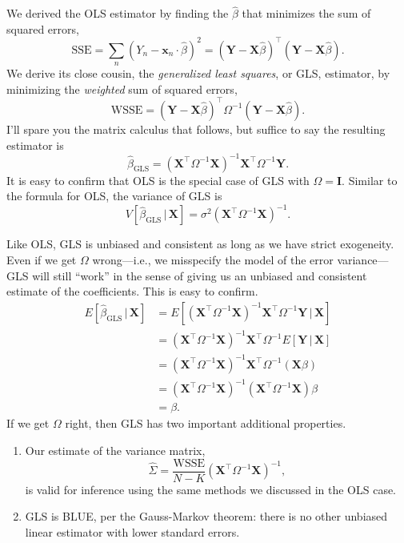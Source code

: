 \documentclass[12pt,oneside,openany]{book}
\begin{document}
We derived the OLS estimator by finding the \(\hat{\beta}\) that
minimizes the sum of squared errors, \[
\text{SSE}
= \sum_n (Y_n - \mathbf{x}_n \cdot \hat{\beta})^2
= (\mathbf{Y} - \mathbf{X} \hat{\beta})^\top (\mathbf{Y} - \mathbf{X} \hat{\beta}).
\] We derive its close cousin, the \emph{generalized least squares}, or
GLS, estimator, by minimizing the \emph{weighted} sum of squared errors,
\[
\text{WSSE} = (\mathbf{Y} - \mathbf{X} \hat{\beta})^\top \Omega^{-1} (\mathbf{Y} - \mathbf{X} \hat{\beta}).
\] I'll spare you the matrix calculus that follows, but suffice to say
the resulting estimator is \[
\hat{\beta}_{\text{GLS}} = (\mathbf{X}^\top \Omega^{-1} \mathbf{X})^{-1} \mathbf{X}^\top \Omega^{-1} \mathbf{Y}.
\] It is easy to confirm that OLS is the special case of GLS with
\(\Omega = \mathbf{I}\). Similar to the formula for OLS, the variance of
GLS is \[
V[\hat{\beta}_{\text{GLS}} \,|\, \mathbf{X}] = \sigma^2 (\mathbf{X}^\top \Omega^{-1} \mathbf{X})^{-1}.
\]

Like OLS, GLS is unbiased and consistent as long as we have strict
exogeneity. Even if we get \(\Omega\) wrong---i.e., we misspecify the
model of the error variance---GLS will still ``work'' in the sense of
giving us an unbiased and consistent estimate of the coefficients. This
is easy to confirm. \[
\begin{aligned}
E [ \hat{\beta}_{\text{GLS}} \,|\, \mathbf{X} ]
&= E [ (\mathbf{X}^\top \Omega^{-1} \mathbf{X})^{-1} \mathbf{X}^\top \Omega^{-1} \mathbf{Y} \,|\, \mathbf{X} ] \\
&= (\mathbf{X}^\top \Omega^{-1} \mathbf{X})^{-1} \mathbf{X}^\top \Omega^{-1} E [\mathbf{Y} \,|\, \mathbf{X} ] \\
&= (\mathbf{X}^\top \Omega^{-1} \mathbf{X})^{-1} \mathbf{X}^\top \Omega^{-1} (\mathbf{X} \beta) \\
&= (\mathbf{X}^\top \Omega^{-1} \mathbf{X})^{-1} (\mathbf{X}^\top \Omega^{-1} \mathbf{X}) \beta \\
&= \beta.
\end{aligned}
\] If we get \(\Omega\) right, then GLS has two important additional
properties.

\begin{enumerate}
\def\labelenumi{\arabic{enumi}.}
\item
  Our estimate of the variance matrix, \[
  \hat{\Sigma} = \frac{\text{WSSE}}{N - K} (\mathbf{X}^\top \Omega^{-1} \mathbf{X})^{-1},
  \] is valid for inference using the same methods we discussed in the
  OLS case.
\item
  GLS is BLUE, per the Gauss-Markov theorem: there is no other unbiased
  linear estimator with lower standard errors.
\end{enumerate}
\end{document}
